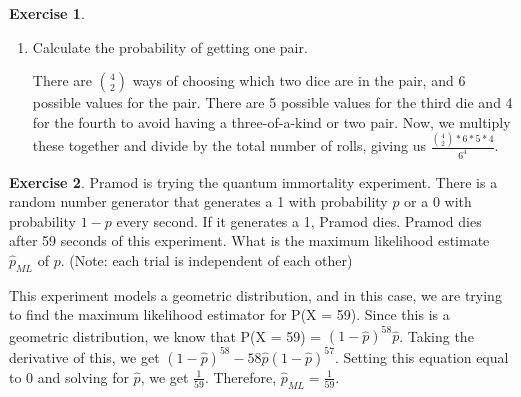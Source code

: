 \documentclass[12pt]{amsart}
\theoremstyle{definition}
\newtheorem{exercise}{Exercise}
\numberwithin{equation}{section}
\theoremstyle{plain}
\begin{document}
\begin{exercise}
\begin{enumerate}[label=\Alph*.)]
\begin{answer}
\end{answer}
\item Calculate the probability of getting one pair.
\begin{answer}
There are $\binom{4}{2}$ ways of choosing which two dice are in the pair, and 6 possible values for the pair. There are 5 possible values for the third die and 4 for the fourth to avoid having a three-of-a-kind or two pair. Now, we multiply these together and divide by the total number of rolls, giving us $\frac{\binom{4}{2}*6*5*4}{6^4}$.
\end{answer}
\end{enumerate}
\end{exercise}

 

\begin{exercise}
    Pramod is trying the quantum immortality experiment. There is a random number generator that generates a 1 with probability $p$ or a 0 with probability $1-p$ every second. If it generates a 1, Pramod dies. Pramod dies after 59 seconds of this experiment. What is the maximum likelihood estimate $\hat{p}_{ML}$ of $p$. (Note: each trial is independent of each other)
    \begin{answer}
    This experiment models a geometric distribution, and in this case, we are trying to find the maximum likelihood estimator for P(X = 59). Since this is a geometric distribution, we know that P(X = 59) = $(1-\hat{p})^{58}\hat{p}$. Taking the derivative of this, we get $(1-\hat{p})^{58} - 58\hat{p}(1-\hat{p})^{57}$. Setting this equation equal to 0 and solving for $\hat{p}$, we get $\frac{1}{59}$. Therefore, $\hat{p}_{ML} = \frac{1}{59}$.
    \end{answer}
\end{exercise}

 
\end{document}

